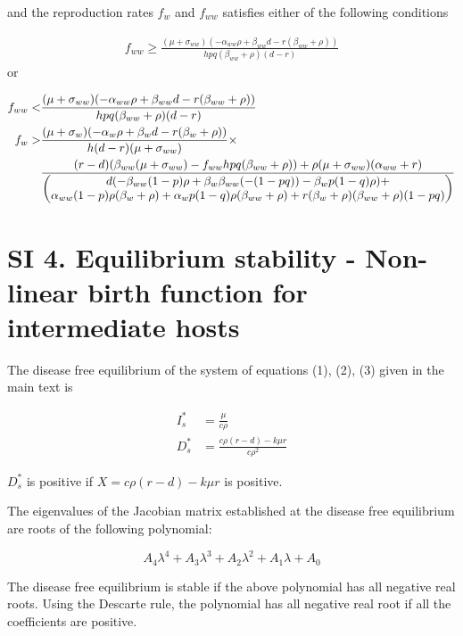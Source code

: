 \documentclass[11pt]{article}
\begin{document}
and the reproduction rates $f_w$ and $f_{ww}$ satisfies either of the following conditions

\begin{align}
	f_{ww} \geq \frac{(\mu + \sigma_{ww}) (-\alpha_{ww} \rho + \beta_{ww}d-r (\beta_{ww}+\rho ))}{h p q (\beta_{ww}+\rho ) (d-r)}
\end{align}
or

\begin{align}
	f_{ww} < &  \frac{(\mu + \sigma_{ww}) (-\alpha_{ww} \rho + \beta_{ww}d-r (\beta_{ww}+\rho ))}{h p q (\beta_{ww}+\rho ) (d-r)} \notag \\
	f_w > & \frac{(\mu + \sigma_w) (- \alpha_w \rho + \beta_w d-r (\beta_w+\rho ))}{h (d-r) (\mu + \sigma_{ww})} \times  \\
	          & \frac{(r-d) (\beta_{ww} (\mu + \sigma_{ww}) - f_{ww} h p q (\beta_{ww}+\rho ))+\rho  (\mu +\sigma_{ww}) (\alpha_{ww} + r)}{\begin{pmatrix}
	          		d (-\beta_{ww} (1-p) \rho +\beta_w \beta_{ww} (-(1-p q))-\beta_w p (1-q) \rho ) + \\
	          		\alpha_{ww} (1-p) \rho  (\beta_w+\rho )+\alpha_w p (1-q) \rho  (\beta_{ww}+\rho )+r (\beta_w+\rho ) (\beta_{ww}+\rho ) (1-p q)
	          	\end{pmatrix}}
\end{align}

\section*{SI 4. Equilibrium stability - Non-linear birth function for intermediate hosts }
The disease free equilibrium of the system of equations (1), (2), (3) given in the main text is

\begin{align}
	I_s^* & = \frac{\mu}{c \rho} \\
	D_s^* & = \frac{c \rho  (r-d)-k \mu  r}{c \rho^2}
\end{align}

$D_s^*$ is positive if $X = c \rho  (r-d)-k \mu  r$ is positive.

The eigenvalues of the Jacobian matrix established at the disease free equilibrium are roots of the following polynomial:

\begin{equation}
	A_4 \lambda^4 + A_3 \lambda^3 + A_2 \lambda^2 + A_1 \lambda + A_0
\end{equation}

The disease free equilibrium is stable if the above polynomial has all negative real roots. Using the Descarte rule, the polynomial has all negative real root if all the coefficients are positive.
\end{document}
